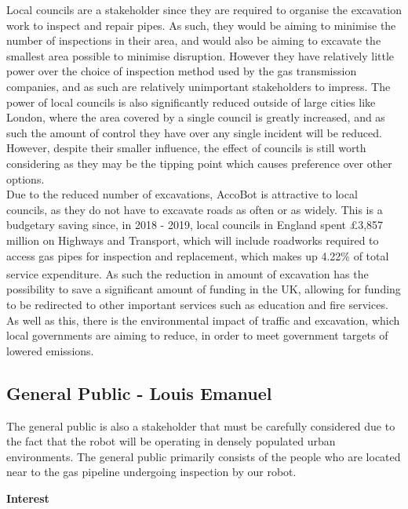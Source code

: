 \documentclass[11pt]{article}		%
\newcommand{\supercite}[1]{\textsuperscript{\cite{#1}}}		%
\begin{document}
			Local councils are a stakeholder since they are required to organise the excavation work to inspect and repair pipes.
			As such, they would be aiming to minimise the number of inspections in their area, and would also be aiming to excavate the smallest area possible to minimise disruption.
			However they have relatively little power over the choice of inspection method used by the gas transmission companies, and as such are relatively unimportant stakeholders to impress.
			The power of local councils is also significantly reduced outside of large cities like London, where the area covered by a single council is greatly increased, and as such the amount of control they have over any single incident will be reduced.
			However, despite their smaller influence, the effect of councils is still worth considering as they may be the tipping point which causes preference over other options.
			\\
			Due to the reduced number of excavations, AccoBot is attractive to local councils, as they do not have to excavate roads as often or as widely.
			This is a budgetary saving since, in 2018 - 2019, local councils in England spent £3,857 million on Highways and Transport, which will include roadworks required to access gas pipes for inspection and replacement, which makes up 4.22\% of total service expenditure\supercite{ministry2020local}.
			As such the reduction in amount of excavation has the possibility to save a significant amount of funding in the UK, allowing for funding to be redirected to other important services such as education and fire services.
			As well as this, there is the environmental impact of traffic and excavation, which local governments are aiming to reduce, in order to meet government targets of lowered emissions.
		
		\subsection[General Public]{General Public - Louis Emanuel}
			The general public is also a stakeholder that must be carefully considered due to the fact that the robot will be operating in densely populated urban environments. The general public primarily consists of the people who are located near to the gas pipeline undergoing inspection by our robot.
			
			\textbf{Interest}
			
\end{document}
